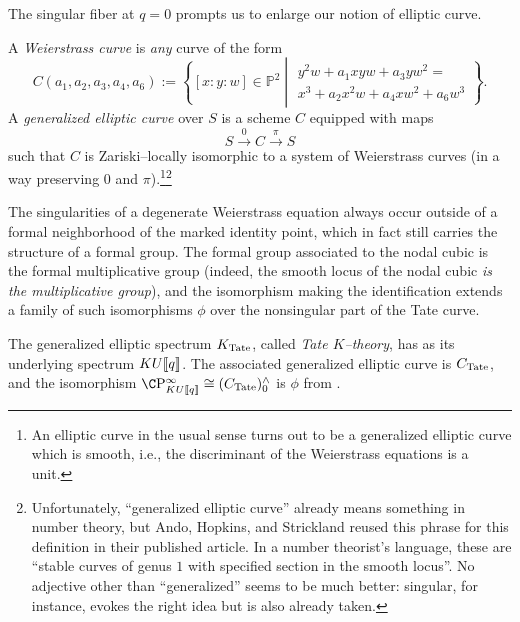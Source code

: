 The singular fiber at \(q = 0\) prompts us to enlarge our notion of elliptic curve.

\begin{definition}
A \textit{Weierstrass curve} is \emph{any} curve of the form \[C(a_1, a_2, a_3, a_4, a_6) := \left\{ [x : y : w] \in \mathbb P^2 \middle| \begin{array}{c} y^2 w + a_1 xyw + a_3 yw^2 = \\ x^3 + a_2 x^2 w + a_4 x w^2 + a_6 w^3 \end{array} \right\}.\]  A \textit{generalized elliptic curve} over \(S\) is a scheme \(C\) equipped with maps \[S \xrightarrow{0} C \xrightarrow{\pi} S\] such that \(C\) is Zariski--locally isomorphic to a system of Weierstrass curves (in a way preserving \(0\) and \(\pi\)).\footnote{An elliptic curve in the usual sense turns out to be a generalized elliptic curve which is smooth, i.e., the discriminant of the Weierstrass equations is a unit.}\footnote{Unfortunately, ``generalized elliptic curve'' already means something in number theory, but Ando, Hopkins, and Strickland reused this phrase for this definition in their published article.  In a number theorist's language, these are ``stable curves of genus \(1\) with specified section in the smooth locus''.  No adjective other than ``generalized'' seems to be much better: singular, for instance, evokes the right idea but is also already taken.}
\end{definition}

\begin{remark}\label{NodalCubicGivesGm}
The singularities of a degenerate Weierstrass equation always occur outside of a formal neighborhood of the marked identity point, which in fact still carries the structure of a formal group.  The formal group associated to the nodal cubic is the formal multiplicative group (indeed, the smooth locus of the nodal cubic \emph{is the multiplicative group}), and the isomorphism making the identification extends a family of such isomorphisms \(\phi\) over the nonsingular part of the Tate curve.
\end{remark}

\begin{definition}\label{TateKTheoryDefn}
The generalized elliptic spectrum \(K_{\mathrm{Tate}}\), called \textit{Tate \(K\)--theory}, has as its underlying spectrum \(KU\llbracket{q}\rrbracket\).  The associated generalized elliptic curve is \(C_{\mathrm{Tate}}\), and the isomorphism \(\CP^\infty_{KU\ps{q}} \cong (C_{\Tate})^\wedge_0\) is \(\phi\) from .
\end{definition}

